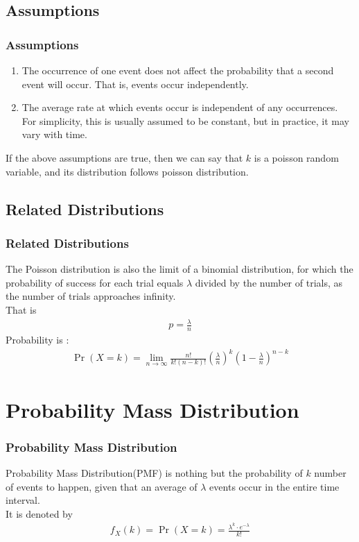 \documentclass{beamer}
\providecommand{\pr}[1]{\ensuremath{\Pr\left(#1\right)}}
\begin{document}
\subsection*{Assumptions}
\begin{frame}[fragile]
\frametitle{Assumptions}
\begin{enumerate}
    \item The occurrence of one event does not affect the probability that a second event will occur. That is, events occur independently.\\
    \item The average rate at which events occur is independent of any occurrences. For simplicity, this is usually assumed to be constant, but in practice, it may  vary with time.
\end{enumerate}
If the above assumptions are true, then we can say that $k$ is a poisson random variable, and its distribution follows  poisson distribution.
\end{frame}
\subsection{Related Distributions}
\begin{frame}
\frametitle{Related Distributions}
The Poisson distribution is also the limit of a binomial distribution, for which the probability of success for each trial equals $\lambda$ divided by the number of trials, as the number of trials approaches infinity.\\
That is
\begin{align}
    p=\frac{\lambda}{n}
\end{align}
Probability is :
\begin{align}
   \pr{X=k}=\lim_{n \to \infty}\frac{n!}{k!(n-k)!}\left(\frac{\lambda}{n}\right)^k\left(1-\frac{\lambda}{n}\right)^{n-k}
\end{align}
\end{frame}
\section*{\textbf{Probability Mass Distribution}}
\begin{frame}[fragile]
\frametitle{Probability Mass Distribution}
Probability Mass Distribution(PMF) is nothing but the probability of $k$ number of events to happen, given that  an average of $\lambda$ events occur in the entire time interval.\\
It is denoted by
\begin{align}
    f_X(k)=\pr{X=k}=\frac{\lambda^k\cdot e^{-\lambda}}{k!}
\end{align}
\end{frame}
\end{document}
